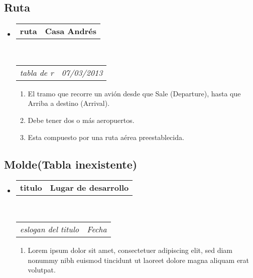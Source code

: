 \documentclass[10pt,letterpaper]{article}
\makeatletter
\newcommand{\headerrow}[2]
{\begin{tabular*}{\linewidth}{l@{\extracolsep{\fill}}r}
	#1 &
	#2 \\
\end{tabular*}}
\makeatother
\begin{document}
\subsection*{Ruta}

\begin{itemize}
	\parskip=0.1em

	\item
	\headerrow
		{\textbf{ruta}}
		{\textbf{Casa Andrés}}
	\\
	\headerrow
		{\emph{tabla de r}}
		{\emph{07/03/2013}}
	\begin{enumerate}
		\item El tramo que recorre un avión desde que Sale (Departure), hasta que Arriba a destino (Arrival).
		\item Debe tener dos o más aeropuertos.
		\item Esta compuesto por una ruta aérea preestablecida.
		
	\end{enumerate}

\end{itemize}

\subsection*{Molde(Tabla inexistente)}

\begin{itemize}
	\parskip=0.1em

	\item
	\headerrow
		{\textbf{titulo}}
		{\textbf{Lugar de desarrollo}}
	\\
	\headerrow
		{\emph{eslogan del titulo}}
		{\emph{Fecha}}
	\begin{enumerate}
		\item Lorem ipsum dolor sit amet, consectetuer adipiscing elit, sed
		diam nonummy nibh euismod tincidunt ut laoreet dolore magna aliquam
		erat volutpat.
	\end{enumerate}

\end{itemize}
\end{document}

